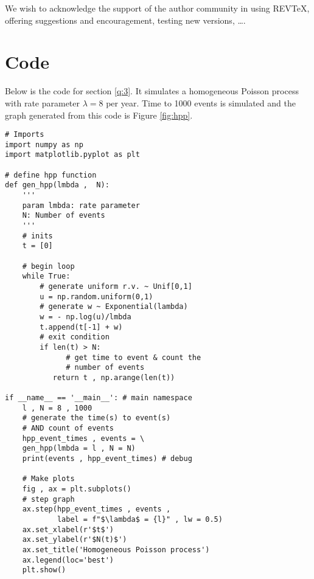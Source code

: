 \documentclass[%
 reprint,
 amsmath,amssymb,
 aps,
]{revtex4-2}
\theoremstyle{definition}
\begin{document}
\begin{acknowledgments}
We wish to acknowledge the support of the author community in using
REV\TeX{}, offering suggestions and encouragement, testing new versions,
\dots.
\end{acknowledgments}

\appendix

\section{Code}
Below is the code for section \ref{q:3}. It simulates a homogeneous Poisson process with rate parameter $\lambda=8$ per year. Time to 1000 events is simulated and the graph generated from this code is Figure \ref{fig:hpp}.
\begin{verbatim}
# Imports
import numpy as np
import matplotlib.pyplot as plt

# define hpp function
def gen_hpp(lmbda ,  N):
    '''
    param lmbda: rate parameter
    N: Number of events
    '''
    # inits
    t = [0]

    # begin loop
    while True:
        # generate uniform r.v. ~ Unif[0,1]
        u = np.random.uniform(0,1) 
        # generate w ~ Exponential(lambda)
        w = - np.log(u)/lmbda 
        t.append(t[-1] + w)
        # exit condition
        if len(t) > N:
        	  # get time to event & count the 
        	  # number of events
           return t , np.arange(len(t)) 

if __name__ == '__main__': # main namespace
    l , N = 8 , 1000
    # generate the time(s) to event(s) 
    # AND count of events 
    hpp_event_times , events = \
    gen_hpp(lmbda = l , N = N) 
    print(events , hpp_event_times) # debug
    
    # Make plots
    fig , ax = plt.subplots()
    # step graph
    ax.step(hpp_event_times , events , 
    		label = f"$\lambda$ = {l}" , lw = 0.5) 
    ax.set_xlabel(r'$t$')
    ax.set_ylabel(r'$N(t)$')
    ax.set_title('Homogeneous Poisson process')
    ax.legend(loc='best')
    plt.show()
\end{verbatim}
\end{document}
